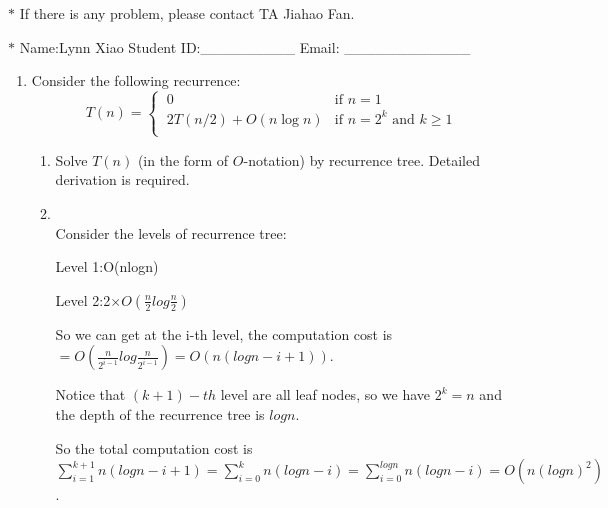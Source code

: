 \documentclass[12pt,a4paper]{article}
\makeatletter
\newtheorem*{solution}{Solution}
\theoremstyle{definition}
\renewenvironment{solution}[1][Solution] {\par\pushQED{\qed}\normalfont\topsep6\p@\@plus6\p@\relax\trivlist\item[\hskip\labelsep\bfseries#1\@addpunct{.}]\ignorespaces}{\popQED\endtrivlist\@endpefalse} \makeatother
\makeatother
\begin{document}
\noindent

\noindent{}
\begin{center}
\footnotesize{\color{red}$*$ If there is any problem, please contact TA Jiahao Fan.}

\footnotesize{\color{blue}$*$ Name:Lynn Xiao  \quad Student ID:\_\_\_\_\_\_\_\_\_ \quad Email: \_\_\_\_\_\_\_\_\_\_\_\_}
\end{center}

\begin{enumerate}
    \item
    Consider the following recurrence:
    \begin{equation*}
    T(n)=
    \begin{cases}
    \ 0 & \text{if } n=1 \\
    \ 2T(n/2)+O(n\log{n}) & \text{if } n=2^k \text{ and } k \geq 1 \\
    \end{cases}
    \end{equation*}
    \begin{enumerate}
        \item
        Solve $T(n)$ (in the form of $O$-notation) by recurrence tree. Detailed derivation is required.
        \begin{solution}
        	~\\
            Consider the levels of recurrence tree:
            
            Level 1:O(nlogn)
            
            Level 2:2$\times O(\frac{n}{2}log\frac{n}{2})$
            
            So we can get at the i-th level, the computation cost is $= O(\frac{n}{2^{i-1}}log\frac{n}{2^{i-1}})=O(n(logn-i+1))$.
            
            Notice that $(k+1)-th$ level are all leaf nodes, so we have $2^k=n$ and the depth of the recurrence tree is $logn$.
            
            So the total computation cost is $\sum_{i=1}^{k+1}n(logn-i+1)=\sum_{i=0}^{k}n(logn-i)=\sum_{i=0}^{logn}n(logn-i)=O(n(logn)^2)$.
            
        \end{solution}


\end{enumerate}
\end{enumerate}
\end{document}
